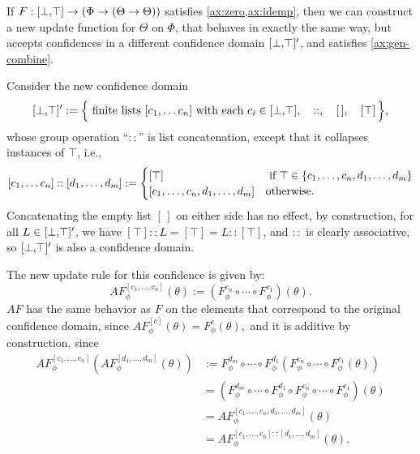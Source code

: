 \begin{subappendices}
    \begin{prop} \label{prop:free-additivity}
    	If $F: [\bot,\!\top] \to (\Phi \to (\Theta \to \Theta))$ satisfies \cref{ax:zero,ax:idemp}, then we can construct a new update
    	function for $\Theta$ on $\Phi$, that behaves in exactly the same way, but accepts confidences in a different confidence domain $[\bot,\!\top]'$, and satisfies \cref{ax:gen-combine}.
    \end{prop}
    \begin{lproof}
    Consider the new confidence domain
    $$
    	[\bot,\!\top]' := \Big\{ \text{ finite lists } [c_1, \ldots c_n]
    		\text{ with each } c_i \in [\bot,\!\top],
    		\quad
    		::,
    		\quad
    		[\,],
    		\quad
    		[\top]
    		\,
    	\Big\},
    $$
    whose group operation ``$::$'' is list concatenation, except that it collapses instances of $\top$, i.e.,
    \[
    	[c_1, \ldots c_n] :: [d_1, \ldots, d_m]
    	 := \begin{cases} \relax
    		 [\top] & \text{ if } \top \in \{c_1, \ldots, c_n,d_1, \ldots,d_m \} \\
    		 [c_1, \ldots, c_{n}, d_1, \ldots, d_m] & \text{otherwise.}
     \end{cases}
    \]
    Concatenating the empty list $[\,]$ on either side has no effect,
    by construction, for all $L \in [\bot,\!\top]'$, we have $[\top] :: L = [\top] = L :: [\top]$,
    and $::$ is clearly associative, so $[\bot,\!\top]'$ is also a confidence domain.

    The new update rule for this confidence is given by:
    	\[
    		AF^{[c_1, \ldots, c_n]}_\phi (\theta)  :=
    				(F^{c_n}_\phi \circ \cdots \circ F^{c_1}_\phi) (\theta).
    	\]
    $AF$ has the same behavior as $F$ on the elements that correspond to the original confidence domain, since
    $
    	AF^{[c]}_\phi(\theta) = F^c_\phi(\theta),
    $
    and it is additive by construction, since
    \begin{align*}
    AF^{[c_1, \ldots, c_n]}_\phi ( AF^{[d_1, \ldots, d_m]}_\phi (\theta) )
    		&:=
    			F^{d_m}_\phi \circ \cdots \circ F^{d_1}_\phi (
    			F^{c_n}_\phi \circ \cdots \circ F^{c_1}_\phi (\theta))\\
    		&= (F^{d_m}_\phi \circ \cdots \circ F^{d_1}_\phi \circ
    		F^{c_n}_\phi \circ \cdots \circ F^{c_1}_\phi) (\theta) \\
    		&= AF^{[c_1, \ldots, c_n, d_1, \ldots, d_m]}_\phi (\theta) \\
    		&= AF^{[c_1, \ldots, c_n] :: [d_1, \ldots, d_m]}_\phi (\theta).
    \end{align*}
    \end{lproof}%
\end{subappendices}
